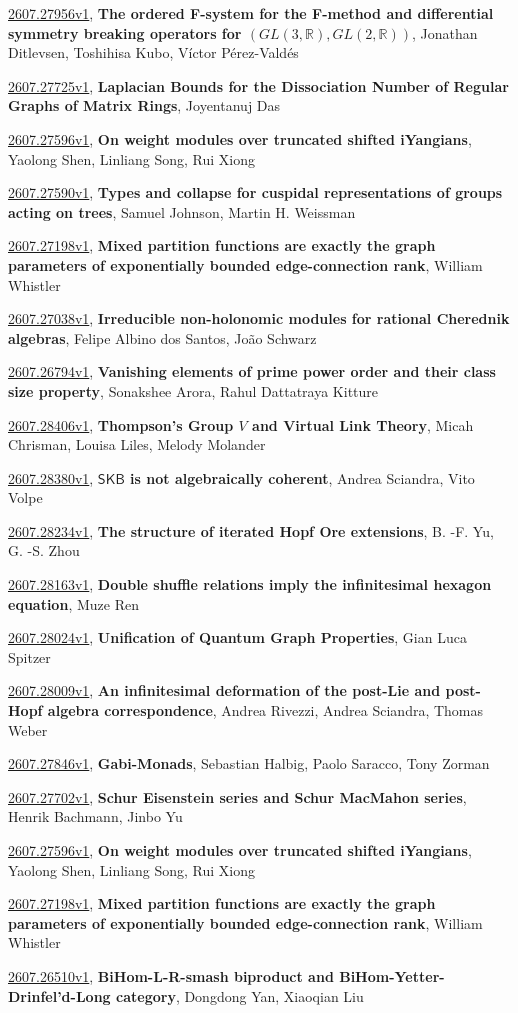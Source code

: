 \documentclass[9pt, a4paper]{article}
\theoremstyle{plain}
\theoremstyle{definition}
\theoremstyle{remark}
\newcommand{\arxiv}[3]{\href{https://arxiv.org/abs/#1}{#1}, \textbf{\textcolor{arxivblue}{#2}}, #3}
\begin{document}
\arxiv{2607.27956v1}{The ordered F-system for the F-method and differential symmetry breaking operators for $(GL(3,\mathbb{R}), GL(2,\mathbb{R}))$}{Jonathan Ditlevsen, Toshihisa Kubo, Víctor Pérez-Valdés}

\arxiv{2607.27725v1}{Laplacian Bounds for the Dissociation Number of Regular Graphs of Matrix Rings}{Joyentanuj Das}

\arxiv{2607.27596v1}{On weight modules over truncated shifted iYangians}{Yaolong Shen, Linliang Song, Rui Xiong}

\arxiv{2607.27590v1}{Types and collapse for cuspidal representations of groups acting on trees}{Samuel Johnson, Martin H. Weissman}

\arxiv{2607.27198v1}{Mixed partition functions are exactly the graph parameters of exponentially bounded edge-connection rank}{William Whistler}

\arxiv{2607.27038v1}{Irreducible non-holonomic modules for rational Cherednik algebras}{Felipe Albino dos Santos, João Schwarz}

\arxiv{2607.26794v1}{Vanishing elements of prime power order and their class size property}{Sonakshee Arora, Rahul Dattatraya Kitture}

\arxiv{2607.28406v1}{Thompson's Group $V$ and Virtual Link Theory}{Micah Chrisman, Louisa Liles, Melody Molander}

\arxiv{2607.28380v1}{$\mathsf{SKB}$ is not algebraically coherent}{Andrea Sciandra, Vito Volpe}

\arxiv{2607.28234v1}{The structure of iterated Hopf Ore extensions}{B. -F. Yu, G. -S. Zhou}

\arxiv{2607.28163v1}{Double shuffle relations imply the infinitesimal hexagon equation}{Muze Ren}

\arxiv{2607.28024v1}{Unification of Quantum Graph Properties}{Gian Luca Spitzer}

\arxiv{2607.28009v1}{An infinitesimal deformation of the post-Lie and post-Hopf algebra correspondence}{Andrea Rivezzi, Andrea Sciandra, Thomas Weber}

\arxiv{2607.27846v1}{Gabi-Monads}{Sebastian Halbig, Paolo Saracco, Tony Zorman}

\arxiv{2607.27702v1}{Schur Eisenstein series and Schur MacMahon series}{Henrik Bachmann, Jinbo Yu}

\arxiv{2607.27596v1}{On weight modules over truncated shifted iYangians}{Yaolong Shen, Linliang Song, Rui Xiong}

\arxiv{2607.27198v1}{Mixed partition functions are exactly the graph parameters of exponentially bounded edge-connection rank}{William Whistler}

\arxiv{2607.26510v1}{BiHom-L-R-smash biproduct and BiHom-Yetter-Drinfel'd-Long category}{Dongdong Yan, Xiaoqian Liu}

\end{document}
